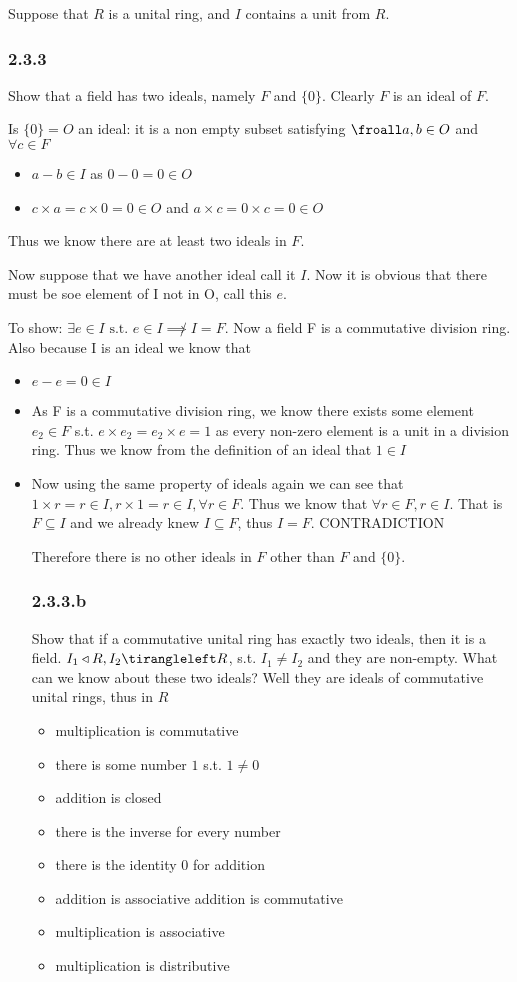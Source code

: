 \begin{itemize}
\begin{itemize}
Suppose that $R$ is a unital ring, and $I$ contains a unit from $R$.

\subsubsection{2.3.3}Show that a field has two ideals, namely $F$ and $\{0\}$.
Clearly $F$ is an ideal of $F$. 

Is $\{0\} = O$ an ideal:
it is a non empty subset satisfying $\froall a,b \in O$ and $\forall c \in F$
\begin{itemize}
\item $a-b\in I$ as $0-0=0 \in O$
\item $c\times a = c\times 0 = 0 \in O$ and $a\times c = 0\times c = 0 \in O$
\end{itemize}
Thus we know there are at least two ideals in $F$.

Now suppose that we have another ideal call it $I$.
Now it is obvious that there must be soe element of I not in O, call this $e$. 

To show: $\exists e \in I \text{ s.t. } e \in I \not\implies I=F$.
Now a field F is a commutative division ring.
Also because I is an ideal we know that 
\begin{itemize} 
\item $e-e=0 \in I$
\item As F is a commutative division ring, we know there exists some element $e_2 \in F$ s.t. $e\times e_2 = e_2 \times e = 1$ as every non-zero element is a unit in a division ring. Thus we know from the definition of an ideal that $1\in I$
\item Now using the same property of ideals again we can see that $1\times r = r \in I, r\times 1 =r \in I, \forall r \in F$. Thus we know that $\forall r\in F, r\in I$. That is $F\subseteq I$ and we already knew $I \subseteq F$, thus $I=F$. CONTRADICTION

Therefore there is no other ideals in $F$ other than $F$ and $\{0\}$.
\subsubsection{2.3.3.b}
Show that if a commutative unital ring has exactly two ideals, then it is a field.
$I_1\triangleleft R,I_2\tirangleleft R$, s.t. $I_1\not=I_2$ and they are non-empty.
What can we know about these two ideals?
Well they are ideals of commutative unital rings, thus in $R$ \begin{itemize}
\item multiplication is commutative
\item there is some number $1$ s.t. $1\not=0$
\item addition is closed
\item there is the inverse for every number
\item there is the identity 0 for addition
\item addition is associative
\tem addition is commutative
\item multiplication is associative
\item multiplication is distributive
\end{itemize}


\end{itemize}
\end{itemize}
\end{itemize}
